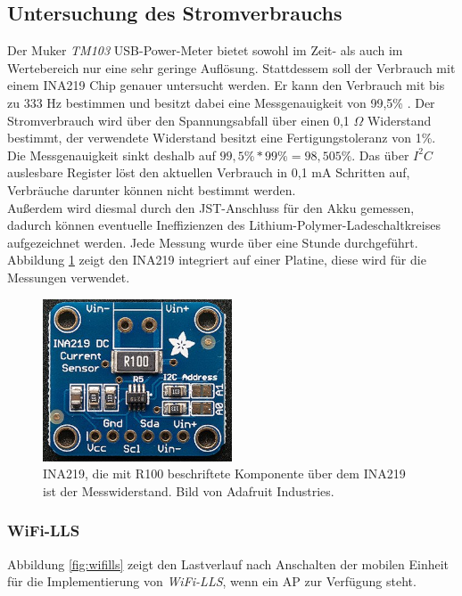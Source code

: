 \subsection{Untersuchung des Stromverbrauchs}
\label{ch:phase1:sec:energie}
Der Muker \emph{TM103} USB-Power-Meter bietet sowohl im Zeit- als auch im Wertebereich nur eine sehr geringe Auflösung.
Stattdessem soll der Verbrauch mit einem INA219 Chip genauer untersucht werden.
Er kann den Verbrauch mit bis zu 333 Hz bestimmen und besitzt dabei eine Messgenauigkeit von 99,5\% \cite{texas2015ina}.
Der Stromverbrauch wird über den Spannungsabfall über einen 0,1 $\Omega$ Widerstand bestimmt, der verwendete Widerstand besitzt eine Fertigungstoleranz von 1\%.
Die Messgenauigkeit sinkt deshalb auf $99,5\% * 99\% = 98,505\%$. 
Das über $I^2C$ auslesbare Register löst den aktuellen Verbrauch in 0,1 mA Schritten auf, Verbräuche darunter können nicht bestimmt werden.\\
Außerdem wird diesmal durch den JST-Anschluss für den Akku gemessen, dadurch können eventuelle Ineffizienzen des Lithium-Polymer-Ladeschaltkreises aufgezeichnet werden. 
Jede Messung wurde über eine Stunde durchgeführt.
Abbildung \ref{fig:ina219} zeigt den INA219 integriert auf einer Platine, diese wird für die Messungen verwendet.

\begin{figure}[h!]
  \centering
	\includegraphics[width=0.5\textwidth]{images/ina219ada.png}
  \caption{INA219, die mit R100 beschriftete Komponente über dem INA219 ist der Messwiderstand. Bild von Adafruit Industries\protect \footnotemark.}
  \label{fig:ina219}
\end{figure}

\subsubsection{WiFi-LLS}
\label{ch:phase1:sec:powerwifills}
Abbildung \ref{fig:wifills} zeigt den Lastverlauf nach Anschalten der mobilen Einheit für die Implementierung von \emph{WiFi-LLS}, wenn ein AP zur Verfügung steht. 

